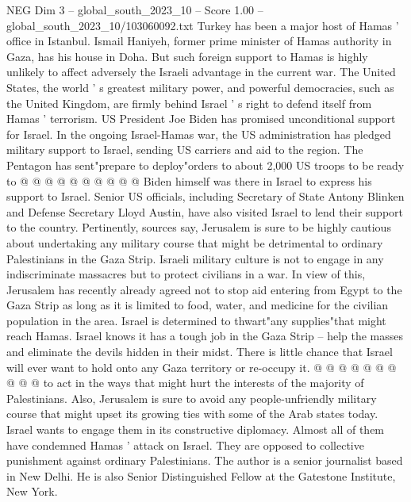 \begin{textsample}{NEG Dim 3 – global\_south\_2023\_10 – Score 1.00 – global\_south\_2023\_10/103060092.txt}
Turkey has been a major host of Hamas ' office in Istanbul.
Ismail Haniyeh, former prime minister of Hamas authority in Gaza, has his house in Doha.
But such foreign support to Hamas is highly unlikely to affect adversely the Israeli advantage in the current war.
The United States, the world ' s greatest military power, and powerful democracies, such as the United Kingdom, are firmly behind Israel ' s right to defend itself from Hamas ' terrorism.
US President Joe Biden has promised unconditional support for Israel.
In the ongoing Israel-Hamas war, the US administration has pledged military support to Israel, sending US carriers and aid to the region.
The Pentagon has sent"prepare to deploy"orders to about 2,000 US troops to be ready to @ @ @ @ @ @ @ @ @ @ Biden himself was there in Israel to express his support to Israel.
Senior US officials, including Secretary of State Antony Blinken and Defense Secretary Lloyd Austin, have also visited Israel to lend their support to the country.
Pertinently, sources say, Jerusalem is sure to be highly cautious about undertaking any military course that might be detrimental to ordinary Palestinians in the Gaza Strip.
Israeli military culture is not to engage in any indiscriminate massacres but to protect civilians in a war.
In view of this, Jerusalem has recently already agreed not to stop aid entering from Egypt to the Gaza Strip as long as it is limited to food, water, and medicine for the civilian population in the area.
Israel is determined to thwart"any supplies"that might reach Hamas.
Israel knows it has a tough job in the Gaza Strip -- help the masses and eliminate the devils hidden in their midst.
There is little chance that Israel will ever want to hold onto any Gaza territory or re-occupy it. @ @ @ @ @ @ @ @ @ @ to act in the ways that might hurt the interests of the majority of Palestinians.
Also, Jerusalem is sure to avoid any people-unfriendly military course that might upset its growing ties with some of the Arab states today.
Israel wants to engage them in its constructive diplomacy.
Almost all of them have condemned Hamas ' attack on Israel.
They are opposed to collective punishment against ordinary Palestinians.
The author is a senior journalist based in New Delhi.
He is also Senior Distinguished Fellow at the Gatestone Institute, New York.

\end{textsample}

